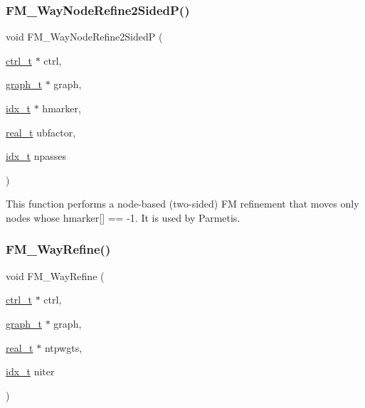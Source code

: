 \subsubsection{\texorpdfstring{F\+M\+\_\+Way\+Node\+Refine2\+Sided\+P()}{FM\_2WayNodeRefine2SidedP()}}
{\footnotesize\ttfamily void F\+M\+\_\+Way\+Node\+Refine2\+SidedP (\begin{DoxyParamCaption}\item[{\hyperlink{a00742}{ctrl\+\_\+t} $\ast$}]{ctrl,  }\item[{\hyperlink{a00734}{graph\+\_\+t} $\ast$}]{graph,  }\item[{\hyperlink{a00876_aaa5262be3e700770163401acb0150f52}{idx\+\_\+t} $\ast$}]{hmarker,  }\item[{\hyperlink{a00876_a1924a4f6907cc3833213aba1f07fcbe9}{real\+\_\+t}}]{ubfactor,  }\item[{\hyperlink{a00876_aaa5262be3e700770163401acb0150f52}{idx\+\_\+t}}]{npasses }\end{DoxyParamCaption})}

This function performs a node-\/based (two-\/sided) FM refinement that moves only nodes whose hmarker\mbox{[}\mbox{]} == -\/1. It is used by Parmetis. \mbox{\label{a00945_a1ffe9ee55eb23e345beb5da3e67c501a}} 
\subsubsection{\texorpdfstring{F\+M\+\_\+Way\+Refine()}{FM\_2WayRefine()}}
{\footnotesize\ttfamily void F\+M\+\_\+Way\+Refine (\begin{DoxyParamCaption}\item[{\hyperlink{a00742}{ctrl\+\_\+t} $\ast$}]{ctrl,  }\item[{\hyperlink{a00734}{graph\+\_\+t} $\ast$}]{graph,  }\item[{\hyperlink{a00876_a1924a4f6907cc3833213aba1f07fcbe9}{real\+\_\+t} $\ast$}]{ntpwgts,  }\item[{\hyperlink{a00876_aaa5262be3e700770163401acb0150f52}{idx\+\_\+t}}]{niter }\end{DoxyParamCaption})}

